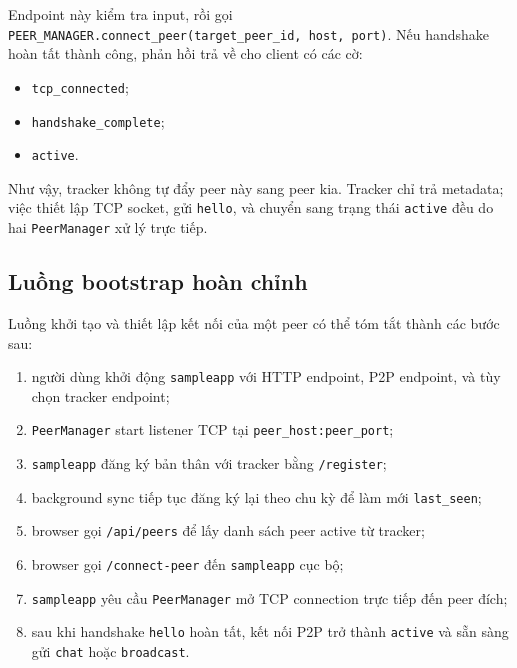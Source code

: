 Endpoint này kiểm tra input, rồi gọi \texttt{PEER\_MANAGER.connect\_peer(target\_peer\_id, host, port)}. Nếu handshake hoàn tất thành công, phản hồi trả về cho client có các cờ:
\begin{itemize}[leftmargin=2em]
    \item \texttt{tcp\_connected};
    \item \texttt{handshake\_complete};
    \item \texttt{active}.
\end{itemize}

Như vậy, tracker không tự đẩy peer này sang peer kia. Tracker chỉ trả metadata; việc thiết lập TCP socket, gửi \texttt{hello}, và chuyển sang trạng thái \texttt{active} đều do hai \texttt{PeerManager} xử lý trực tiếp.

\subsection{Luồng bootstrap hoàn chỉnh}
Luồng khởi tạo và thiết lập kết nối của một peer có thể tóm tắt thành các bước sau:
\begin{enumerate}[leftmargin=2em]
    \item người dùng khởi động \texttt{sampleapp} với HTTP endpoint, P2P endpoint, và tùy chọn tracker endpoint;
    \item \texttt{PeerManager} start listener TCP tại \texttt{peer\_host:peer\_port};
    \item \texttt{sampleapp} đăng ký bản thân với tracker bằng \texttt{/register};
    \item background sync tiếp tục đăng ký lại theo chu kỳ để làm mới \texttt{last\_seen};
    \item browser gọi \texttt{/api/peers} để lấy danh sách peer active từ tracker;
    \item browser gọi \texttt{/connect-peer} đến \texttt{sampleapp} cục bộ;
    \item \texttt{sampleapp} yêu cầu \texttt{PeerManager} mở TCP connection trực tiếp đến peer đích;
    \item sau khi handshake \texttt{hello} hoàn tất, kết nối P2P trở thành \texttt{active} và sẵn sàng gửi \texttt{chat} hoặc \texttt{broadcast}.
\end{enumerate}

